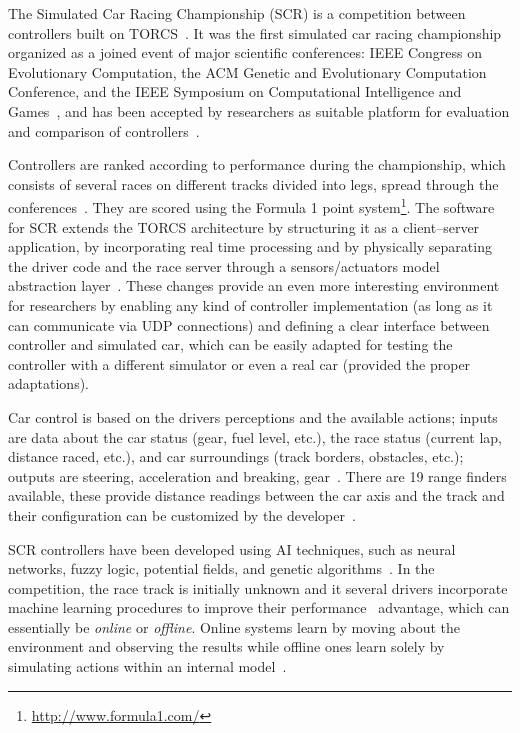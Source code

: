 The Simulated Car Racing Championship (SCR) is a competition between controllers built on TORCS~\cite{SCR}. It was the first simulated car racing championship organized as a joined event of major scientific conferences: IEEE Congress on Evolutionary Computation, the ACM Genetic and Evolutionary Computation Conference, and the IEEE Symposium on Computational Intelligence and Games~\cite{2009}, and has been accepted by researchers as suitable platform for evaluation and comparison of controllers~\cite{SIMUTORCS}.

Controllers are ranked according to performance during the championship, which consists of several races on different tracks divided into legs, spread through the conferences~\cite{2009}. They are scored using the Formula 1 point system\footnote{\url{http://www.formula1.com/}}. The software for SCR extends the TORCS architecture by structuring it as a client–server application, by incorporating real time processing and by physically separating the driver code and the race server through a sensors/actuators model abstraction layer~\cite{2009}. These changes provide an even more interesting environment for researchers by enabling any kind of controller implementation (as long as it can communicate via UDP connections) and defining a clear interface between controller and simulated car, which can be easily adapted for testing the controller with a different simulator or even a real car (provided the proper adaptations).

Car control is based on the drivers perceptions and the available actions; inputs are data about the car status (gear, fuel level, etc.), the race status (current lap, distance raced, etc.), and car surroundings (track borders, obstacles, etc.); outputs are steering, acceleration and breaking, gear~\cite{SCR}. There are 19 range finders available, these provide distance readings between the car axis and the track and their configuration can be customized by the developer~\cite{SCR}.

SCR controllers have been developed using AI techniques, such as neural networks, fuzzy logic, potential fields, and genetic algorithms~\cite{Loiacono:2012:LEA:2212908.2212953}. In the competition, the race track is initially unknown and it several drivers incorporate machine learning procedures to improve their performance~\cite{2009} advantage, which can essentially be \emph{online} or \emph{offline}. Online systems learn by moving about the environment and observing the results while offline ones learn solely by simulating actions within an internal model~\cite{mitchell_1997}.

